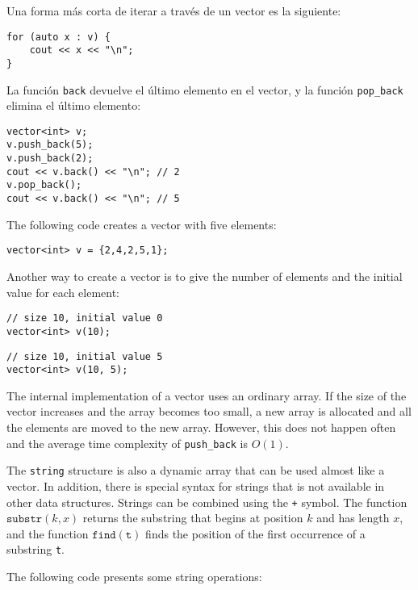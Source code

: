 \begin{samepage}
Una forma más corta de iterar a través de un vector es la siguiente:

\begin{lstlisting}
for (auto x : v) {
    cout << x << "\n";
}
\end{lstlisting}
\end{samepage}

La función \texttt{back} devuelve el último elemento
en el vector, y
la función \texttt{pop\_back} elimina el último elemento:

\begin{lstlisting}
vector<int> v;
v.push_back(5);
v.push_back(2);
cout << v.back() << "\n"; // 2
v.pop_back();
cout << v.back() << "\n"; // 5
\end{lstlisting}

The following code creates a vector with five elements:

\begin{lstlisting}
vector<int> v = {2,4,2,5,1};
\end{lstlisting}

Another way to create a vector is to give the number
of elements and the initial value for each element:

\begin{lstlisting}
// size 10, initial value 0
vector<int> v(10);
\end{lstlisting}
\begin{lstlisting}
// size 10, initial value 5
vector<int> v(10, 5);
\end{lstlisting}

The internal implementation of a vector
uses an ordinary array.
If the size of the vector increases and
the array becomes too small,
a new array is allocated and all the
elements are moved to the new array.
However, this does not happen often and the
average time complexity of
\texttt{push\_back} is $O(1)$.


The \texttt{string} structure
is also a dynamic array that can be used almost like a vector.
In addition, there is special syntax for strings
that is not available in other data structures.
Strings can be combined using the \texttt{+} symbol.
The function $\texttt{substr}(k,x)$ returns the substring
that begins at position $k$ and has length $x$,
and the function $\texttt{find}(\texttt{t})$ finds the position
of the first occurrence of a substring \texttt{t}.

The following code presents some string operations:


